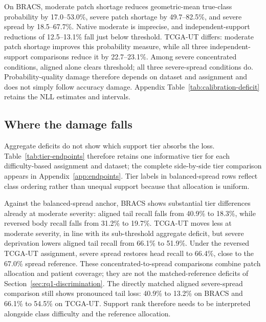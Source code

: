 \documentclass[11pt]{article}
\newcommand{\resultstable}[1]{}
\begin{document}
On BRACS, moderate patch shortage reduces geometric-mean true-class probability by \num{17.0}--\num{53.0}\%, severe patch shortage by \num{49.7}--\num{82.5}\%, and severe spread by \num{18.5}--\num{67.7}\%. Native moderate is imprecise, and independent-support reductions of \num{12.5}--\num{13.1}\% fall just below threshold. TCGA-UT differs: moderate patch shortage improves this probability measure, while all three independent-support comparisons reduce it by \num{22.7}--\num{23.1}\%. Among severe concentrated conditions, aligned alone clears threshold; all three severe-spread conditions do. Probability-quality damage therefore depends on dataset and assignment and does not simply follow accuracy damage. Appendix Table~\ref{tab:calibration-deficit} retains the NLL estimates and intervals.

\subsection{Where the damage falls}
\label{sec:rq1-incidence}
Aggregate deficits do not show which support tier absorbs the loss. Table~\ref{tab:tier-endpoints} therefore retains one informative tier for each difficulty-based assignment and dataset; the complete side-by-side tier comparison appears in Appendix~\ref{app:endpoints}. Tier labels in balanced-spread rows reflect class ordering rather than unequal support because that allocation is uniform.

\begin{table}[ht]
  \centering
  \footnotesize
  \resultstable{tier_endpoints_summary}
  \caption{Selected tier recall (\%). Aligned assigns the fewest patches to the hardest classes; reversed assigns those classes the most patches. Head, body, and tail denote high-, intermediate-, and low-support tiers.}
  \label{tab:tier-endpoints}
\end{table}

\noindent Against the balanced-spread anchor, BRACS shows substantial tier differences already at moderate severity: aligned tail recall falls from \num{40.9}\% to \num{18.3}\%, while reversed body recall falls from \num{31.2}\% to \num{19.7}\%. TCGA-UT moves less at moderate severity, in line with its sub-threshold aggregate deficit, but severe deprivation lowers aligned tail recall from \num{66.1}\% to \num{51.9}\%. Under the reversed TCGA-UT assignment, severe spread restores head recall to \num{66.4}\%, close to the \num{67.0}\% spread reference. These concentrated-to-spread comparisons combine patch allocation and patient coverage; they are not the matched-reference deficits of Section~\ref{sec:rq1-discrimination}. The directly matched aligned severe-spread comparison still shows pronounced tail loss: \num{40.9}\% to \num{13.2}\% on BRACS and \num{66.1}\% to \num{54.5}\% on TCGA-UT. Support rank therefore needs to be interpreted alongside class difficulty and the reference allocation.
\end{document}

